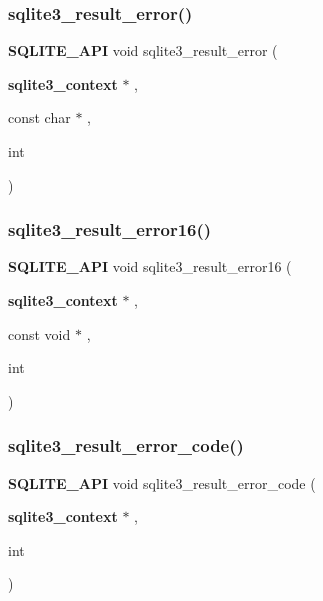 \mbox{\label{sqlite3_8h_a577161e1b67908b94f47007aaa6ae4c4}} 
\subsubsection{sqlite3\_result\_error()}
{\footnotesize\ttfamily \textbf{ S\+Q\+L\+I\+T\+E\+\_\+\+A\+PI} void sqlite3\+\_\+result\+\_\+error (\begin{DoxyParamCaption}\item[{\textbf{ sqlite3\+\_\+context} $\ast$}]{,  }\item[{const char $\ast$}]{,  }\item[{int}]{ }\end{DoxyParamCaption})}

\mbox{\label{sqlite3_8h_a2baa2d4dd3dc187608d942f3edfd46da}} 
\subsubsection{sqlite3\_result\_error16()}
{\footnotesize\ttfamily \textbf{ S\+Q\+L\+I\+T\+E\+\_\+\+A\+PI} void sqlite3\+\_\+result\+\_\+error16 (\begin{DoxyParamCaption}\item[{\textbf{ sqlite3\+\_\+context} $\ast$}]{,  }\item[{const void $\ast$}]{,  }\item[{int}]{ }\end{DoxyParamCaption})}

\mbox{\label{sqlite3_8h_ac7ad2457fb9a1b7b772caf8e48deb8bc}} 
\subsubsection{sqlite3\_result\_error\_code()}
{\footnotesize\ttfamily \textbf{ S\+Q\+L\+I\+T\+E\+\_\+\+A\+PI} void sqlite3\+\_\+result\+\_\+error\+\_\+code (\begin{DoxyParamCaption}\item[{\textbf{ sqlite3\+\_\+context} $\ast$}]{,  }\item[{int}]{ }\end{DoxyParamCaption})}

